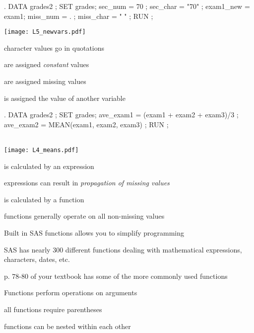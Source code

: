 \begin{frame}[fragile]
\hspace*{-0.2in}
\begin{code}{.}
DATA grades2 ;
  SET grades;
  sec_num = 70 ;
  sec_char = "70" ;
  exam1_new = exam1;
  miss_num = . ;
  miss_char = " " ;
RUN ;
\end{code}
\emp
{} \hspace{0.1in} \emp
{}
\texttt{[image: L5\_newvars.pdf]}
\emp\\
\bi
\item[]
\item character values go in quotations
\item {} are assigned \emph{constant} values
\item {} are assigned missing values
\item {} is assigned the value of another variable
\ei
\end{frame}

\begin{frame}[fragile]
\begin{code}{.}
DATA grades2 ;
   SET grades;
   ave_exam1 = (exam1 + exam2 + exam3)/3 ;
   ave_exam2 =  MEAN(exam1, exam2, exam3) ;
RUN ;
\end{code}
\emp\\
\texttt{[image: L4\_means.pdf]}
\bi
\item {} is calculated by an expression
\item[] expressions can result in \emph{propagation of missing values}
\item {} is calculated by a function
\item[] functions generally operate on all non-missing values
\ei
\end{frame}


\begin{frame}
\bi
\item Built in SAS functions allows you to simplify programming
\item SAS has nearly 300 different functions dealing with mathematical expressions, characters, dates, etc.
\item p. 78-80 of your textbook has some of the more commonly used functions
\item Functions perform operations on arguments
\bi
\item all functions require parentheses
\item functions can be nested within each other
\ei
\ei
\end{frame}

